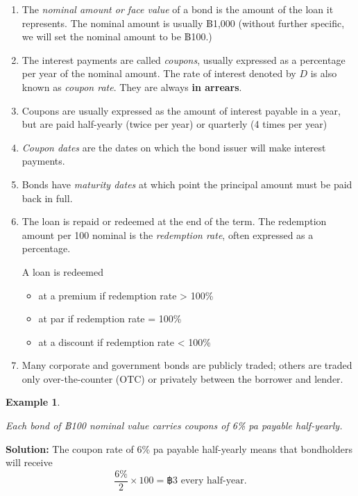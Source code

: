 \documentclass[
]{book}
\theoremstyle{definition}
\theoremstyle{definition}
\newtheorem{example}{Example}[chapter]
\theoremstyle{definition}
\theoremstyle{definition}
\theoremstyle{remark}
\begin{document}
\begin{enumerate}
\def\labelenumi{\arabic{enumi}.}
\item
  The \emph{nominal amount or face value} of a bond is the amount of the
  loan it represents. The nominal amount is usually ฿1,000 (without
  further specific, we will set the nominal amount to be ฿100.)
\item
  The interest payments are called \emph{coupons}, usually expressed as a
  percentage per year of the nominal amount. The rate of interest
  denoted by \(D\) is also known as \emph{coupon rate}. They are always \textbf{in
  arrears}.
\item
  Coupons are usually expressed as the amount of interest payable in a
  year, but are paid half-yearly (twice per year) or quarterly (4
  times per year)
\item
  \emph{Coupon dates} are the dates on which the bond issuer will make
  interest payments.
\item
  Bonds have \emph{maturity dates} at which point the principal amount must
  be paid back in full.
\item
  The loan is repaid or redeemed at the end of the term. The
  redemption amount per 100 nominal is the \emph{redemption rate}, often
  expressed as a percentage.

  A loan is redeemed

  \begin{itemize}
  \item
    at a premium if redemption rate \textgreater{} 100\%
  \item
    at par if redemption rate = 100\%
  \item
    at a discount if redemption rate \textless{} 100\%
  \end{itemize}
\item
  Many corporate and government bonds are publicly traded; others are
  traded only over-the-counter (OTC) or privately between the borrower
  and lender.
\end{enumerate}

\begin{example}
\protect\hypertarget{exm:unlabeled-div-53}{}\label{exm:unlabeled-div-53}

\emph{Each bond of ฿100 nominal value carries coupons of 6\% pa payable
half-yearly.}

\end{example}

\textbf{Solution:} The coupon rate of 6\% pa payable half-yearly means that
bondholders will receive
\[ \frac{6\%}{2} \times 100 = ฿ 3 \text{ every half-year}.\]
\end{document}
